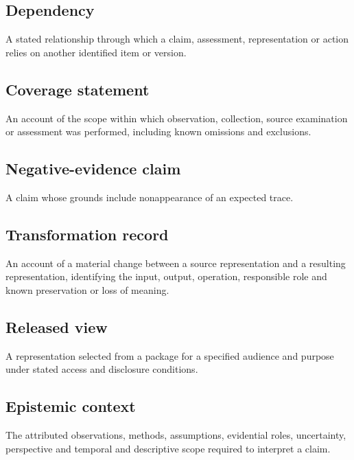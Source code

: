\documentclass[11pt,a4paper]{article}
\begin{document}
\subsection{Dependency}
A stated relationship through which a claim, assessment, representation or action relies on another identified item or version.

\subsection{Coverage statement}
An account of the scope within which observation, collection, source examination or assessment was performed, including known omissions and exclusions.

\subsection{Negative-evidence claim}
A claim whose grounds include nonappearance of an expected trace.

\subsection{Transformation record}
An account of a material change between a source representation and a resulting representation, identifying the input, output, operation, responsible role and known preservation or loss of meaning.

\subsection{Released view}
A representation selected from a package for a specified audience and purpose under stated access and disclosure conditions.

\subsection{Epistemic context}
The attributed observations, methods, assumptions, evidential roles, uncertainty, perspective and temporal and descriptive scope required to interpret a claim.
\end{document}
